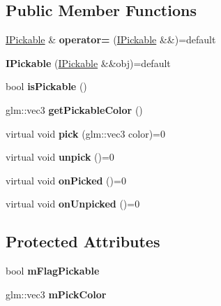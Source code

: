 \subsection*{Public Member Functions}
\begin{DoxyCompactItemize}
\item 
\mbox{\label{classflw_1_1flf_1_1IPickable_ad5548ce0d61e0de87c326ca9996e4e63}} 
\hyperlink{classflw_1_1flf_1_1IPickable}{I\+Pickable} \& {\bfseries operator=} (\hyperlink{classflw_1_1flf_1_1IPickable}{I\+Pickable} \&\&)=default
\item 
\mbox{\label{classflw_1_1flf_1_1IPickable_a23026eef800645cb54962075284409d3}} 
{\bfseries I\+Pickable} (\hyperlink{classflw_1_1flf_1_1IPickable}{I\+Pickable} \&\&obj)=default
\item 
\mbox{\label{classflw_1_1flf_1_1IPickable_a4314c9173e0cd472e7c4859cafdf9361}} 
bool {\bfseries is\+Pickable} ()
\item 
\mbox{\label{classflw_1_1flf_1_1IPickable_a60a3e5e14ffc945860cb2d7d2d299cdd}} 
glm\+::vec3 {\bfseries get\+Pickable\+Color} ()
\item 
\mbox{\label{classflw_1_1flf_1_1IPickable_a979510a0522d576a2201c0b6f1139dd5}} 
virtual void {\bfseries pick} (glm\+::vec3 color)=0
\item 
\mbox{\label{classflw_1_1flf_1_1IPickable_a77481a6bd8396869c521667ae5204a48}} 
virtual void {\bfseries unpick} ()=0
\item 
\mbox{\label{classflw_1_1flf_1_1IPickable_aaa0dcbb8e0b550ce47c1aace8e277697}} 
virtual void {\bfseries on\+Picked} ()=0
\item 
\mbox{\label{classflw_1_1flf_1_1IPickable_a98314352f99703305ac7ea382bf2ce2e}} 
virtual void {\bfseries on\+Unpicked} ()=0
\end{DoxyCompactItemize}
\subsection*{Protected Attributes}
\begin{DoxyCompactItemize}
\item 
\mbox{\label{classflw_1_1flf_1_1IPickable_adec6dd390430db763ad984910d609a97}} 
bool {\bfseries m\+Flag\+Pickable}
\item 
\mbox{\label{classflw_1_1flf_1_1IPickable_a4c5c7fc12317784810dce16a649be2d1}} 
glm\+::vec3 {\bfseries m\+Pick\+Color}
\end{DoxyCompactItemize}


